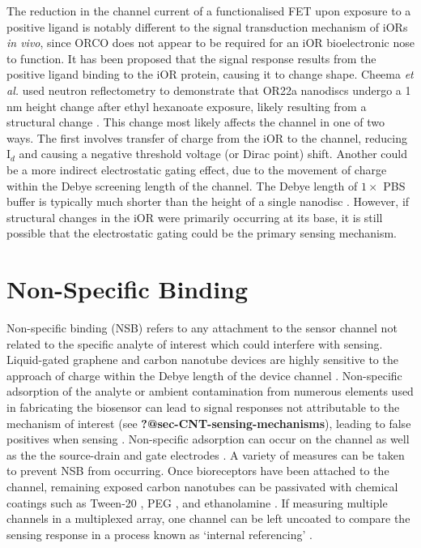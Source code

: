 \documentclass[
  a4paper,
]{scrbook}
\begin{document}
The reduction in the channel current of a functionalised FET upon
exposure to a positive ligand is notably different to the signal
transduction mechanism of iORs \emph{in vivo}, since ORCO does not
appear to be required for an iOR bioelectronic nose to function. It has
been proposed that the signal response results from the positive ligand
binding to the iOR protein, causing it to change shape. Cheema \emph{et
al.} used neutron reflectometry to demonstrate that OR22a nanodiscs
undergo a 1 nm height change after ethyl hexanoate exposure, likely
resulting from a structural change \autocite{Cheema2021}. This change
most likely affects the channel in one of two ways. The first involves
transfer of charge from the iOR to the channel, reducing I\(_{d}\) and
causing a negative threshold voltage (or Dirac point) shift. Another
could be a more indirect electrostatic gating effect, due to the
movement of charge within the Debye screening length of the channel. The
Debye length of \(1 \times\) PBS buffer is typically much shorter than
the height of a single nanodisc \autocite{Murugathas2019a}. However, if
structural changes in the iOR were primarily occurring at its base, it
is still possible that the electrostatic gating could be the primary
sensing mechanism.

\hypertarget{sec-non-specific-binding}{%
\section{Non-Specific Binding}\label{sec-non-specific-binding}}

Non-specific binding (NSB) refers to any attachment to the sensor
channel not related to the specific analyte of interest which could
interfere with sensing. Liquid-gated graphene and carbon nanotube
devices are highly sensitive to the approach of charge within the Debye
length of the device channel \autocite{Shkodra2021}. Non-specific
adsorption of the analyte or ambient contamination from numerous
elements used in fabricating the biosensor can lead to signal responses
not attributable to the mechanism of interest (see
\textbf{?@sec-CNT-sensing-mechanisms}), leading to false positives when
sensing \autocite{Star2003a,Chen2004,Fruh2011,Shkodra2021}. Non-specific
adsorption can occur on the channel as well as the the source-drain and
gate electrodes \autocite{Chen2004}. A variety of measures can be taken
to prevent NSB from occurring. Once bioreceptors have been attached to
the channel, remaining exposed carbon nanotubes can be passivated with
chemical coatings such as Tween-20 \autocite{Chen2004}, PEG
\autocite{Star2003a,Lee2012b}, and ethanolamine
\autocite{Maehashi2007,Das2011}. If measuring multiple channels in a
multiplexed array, one channel can be left uncoated to compare the
sensing response in a process known as `internal referencing'
\autocite{Shkodra2021}.
\end{document}
